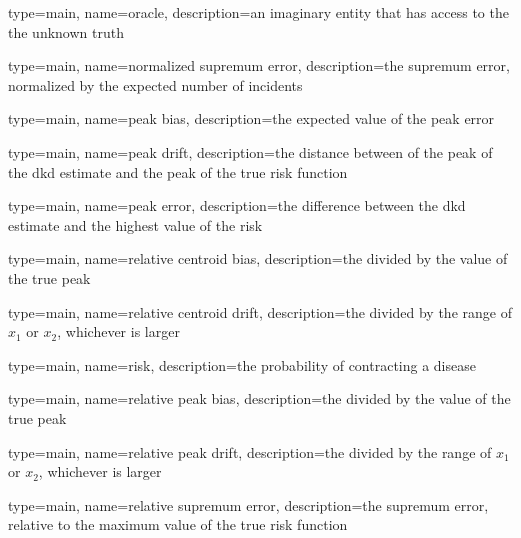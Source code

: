 {
   type=main,
   name={oracle},
   description={an imaginary entity that has access to the the unknown truth}
}

{%
   type=main,
   name={normalized supremum error},
   description={the supremum error, normalized by the expected number of incidents}
}

{%
   type=main,
   name={peak bias},
   description={the expected value of the peak error}
}

{%
   type=main,
   name={peak drift},
   description={the distance between of the peak of the dkd estimate and the peak of the true risk function}
}

{%
   type=main,
   name={peak error},
   description={the difference between the dkd estimate and the highest value of the risk}
}

{%
   type=main,
   name={relative centroid bias},
   description={the  divided by the value of the true peak}
}

{%
   type=main,
   name={relative centroid drift},
   description={the  divided by the range of \ensuremath{x_1} or \ensuremath{x_2}, whichever is larger}
}

{
   type=main,
   name={risk},
   description={the probability of contracting a disease}
}

{%
   type=main,
   name={relative peak bias},
   description={the  divided by the value of the true peak}
}

{%
   type=main,
   name={relative peak drift},
   description={the  divided by the range of \ensuremath{x_1} or \ensuremath{x_2}, whichever is larger}
}

{%
   type=main,
   name={relative supremum error},
   description={the supremum error, relative to the maximum value of the true risk function}
}


